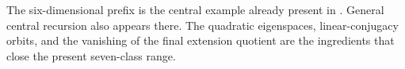 The six-dimensional prefix is the central example already present in
\cite[Lemma~10.3(1)]{Zhang1998}. General central recursion also appears
there. The quadratic eigenspaces, linear-conjugacy orbits, and the
vanishing of the final extension quotient are the ingredients that
close the present seven-class range.
